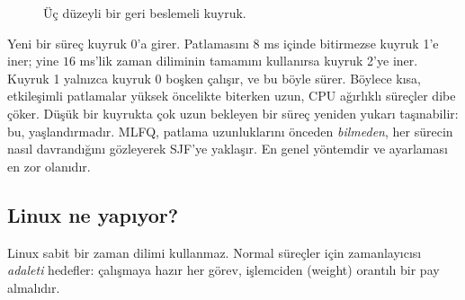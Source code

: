 \begin{figure}[H]
\centering
{}
\caption{Üç düzeyli bir geri beslemeli kuyruk.}
\end{figure}

Yeni bir süreç kuyruk 0'a girer. Patlamasını $8$ ms içinde bitirmezse kuyruk 1'e iner; yine $16$ ms'lik zaman diliminin tamamını kullanırsa kuyruk 2'ye iner. Kuyruk 1 yalnızca kuyruk 0 boşken çalışır, ve bu böyle sürer. Böylece kısa, etkileşimli patlamalar yüksek öncelikte biterken uzun, CPU ağırlıklı süreçler dibe çöker. Düşük bir kuyrukta çok uzun bekleyen bir süreç yeniden yukarı taşınabilir: bu, yaşlandırmadır. MLFQ, patlama uzunluklarını önceden \emph{bilmeden}, her sürecin nasıl davrandığını gözleyerek SJF'ye yaklaşır. En genel yöntemdir ve ayarlaması en zor olanıdır.

\subsection{Linux ne yapıyor?}

Linux sabit bir zaman dilimi kullanmaz. Normal süreçler için zamanlayıcısı \emph{adaleti} hedefler: çalışmaya hazır her görev, işlemciden  (weight) orantılı bir pay almalıdır.

